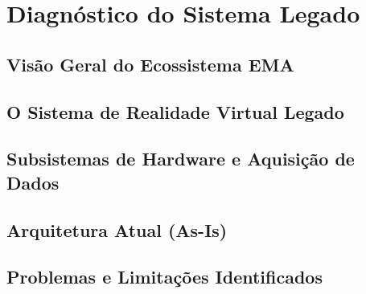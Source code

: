 \chapter{Diagnóstico do Sistema Legado}
\label{cap:diagnostico}

\section{Visão Geral do Ecossistema EMA}

\section{O Sistema de Realidade Virtual Legado}

\section{Subsistemas de Hardware e Aquisição de Dados}

\section{Arquitetura Atual (As-Is)}

\section{Problemas e Limitações Identificados}
